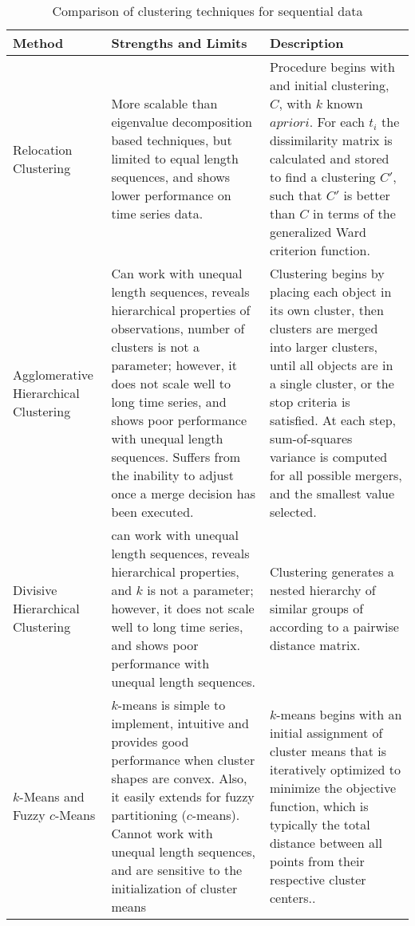 \begin{landscape}
\begin{table}
    \caption{Comparison of clustering techniques for sequential data
    \label{clusteringAlgs}}
    \begin{tabular}{| p{2cm} | p{10.5cm} | p{8.5cm}  |}
    \hline
    \textbf{Method} & \textbf{Strengths and Limits} & \textbf{Description} \\ \hline

Relocation Clustering & More scalable than eigenvalue decomposition based techniques, but limited to equal length sequences, and shows lower performance on time series data. & Procedure begins with and initial clustering, $C$, with $k$ known $a priori$. For each $t_i$ the dissimilarity matrix is calculated and stored to find a clustering $C'$, such that $C'$ is better than $C$ in terms of the generalized Ward criterion function.\\ \hline

Agglomerative Hierarchical Clustering & Can work with unequal length sequences, reveals hierarchical properties of observations, number of clusters is not a parameter; however, it does not scale well to long time series, and shows poor performance with unequal length sequences.  Suffers from the inability to adjust once a merge decision has been executed. & Clustering begins by placing each object in its own cluster, then clusters are merged into larger clusters, until all objects are in a single cluster, or the stop criteria is satisfied. At each step, sum-of-squares variance is computed for all possible mergers, and the smallest value selected.\\ \hline

   Divisive Hierarchical Clustering & can work with unequal length sequences, reveals hierarchical properties, and $k$ is not a parameter; however, it does not scale well to long time series, and shows poor performance with unequal length sequences. & Clustering generates a nested hierarchy of similar groups of according to a pairwise distance matrix.\\ \hline

$k$-Means and Fuzzy $c$-Means & $k$-means is simple to implement, intuitive and provides good performance when cluster shapes are convex.  Also, it easily extends for fuzzy partitioning ($c$-means). Cannot work with unequal length sequences, and are sensitive to the initialization of cluster means & $k$-means begins with an initial assignment of cluster means that is iteratively optimized to minimize the objective function, which is typically the total distance between all points from their respective cluster centers..  \\ \hline


\end{tabular}
\end{table}
\end{landscape}

